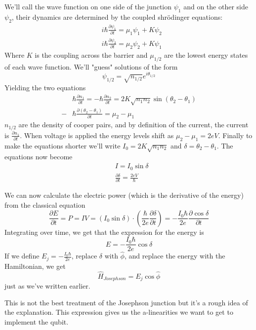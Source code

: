 We'll call the wave function on one side of the junction $\psi_1$ and on the other side $\psi_2$, their dynamics are determined by the coupled shr\"{o}dinger equations:
\begin{align*}
    &i\hbar\frac{\partial \psi_1}{\partial t} = \mu_1 \psi_1 + K \psi_2 \\
    &i\hbar\frac{\partial \psi_2}{\partial t} = \mu_2 \psi_2 + K \psi_1 
\end{align*}
Where $K$ is the coupling across the barrier and $\mu_{1/2}$ are the lowest energy states of each wave function. We'll "guess" solutions of the form
\[
    \psi_{1/2} = \sqrt{n_{1/2}}e^{i\theta_{1/2}}
\]
Yielding the two equations
\begin{align*}
    &\hbar \frac{\partial n_1}{\partial t} = - \hbar \frac{\partial n_2}{\partial t} = 2K \sqrt{n_1 n_2} \sin (\theta_2 - \theta_1) \\
    -&\hbar \frac{\partial (\theta_2 - \theta_1)}{\partial t} = \mu_2 - \mu_1
\end{align*}
$n_{1/2}$ are the density of cooper pairs, and by definition of the current, the current is $\frac{\partial n_1}{\partial t}$. When voltage is applied the energy levels shift as $\mu_2 - \mu_1 = 2eV$. Finally to make the equations shorter we'll write $I_0 = 2K\sqrt{n_1 n_2}$ and $\delta = \theta_2 - \theta_1$. The equations now become
\begin{align*}
    &I = I_0 \sin \delta \\
    &\frac{\partial \delta}{\partial t} = \frac{2eV}{\hbar}
\end{align*}

We can now calculate the electric power (which is the derivative of the energy) from the classical equation
\[
    \frac{\partial E}{\partial t} = P = I V = (I_0 \sin \delta) \cdot (\frac{\hbar}{2e} \frac{\partial \delta}{\partial t}) = -\frac{I_0 \hbar}{2e} \frac{\partial \cos \delta}{\partial t}
\]
Integrating over time, we get that the expression for the energy is
\[
    E = -\frac{I_0 \hbar}{2e} \cos \delta
\]
If we define $E_j = -\frac{I_0 \hbar}{2e}$, replace $\delta$ with $\hat{\phi}$, and replace the energy with the Hamiltonian, we get
\[
    \hat{H}_{Josephson} = E_j \cos \hat{\phi}
\]
just as we've written earlier.

This is not the best treatment of the Josephson junction but it's a rough idea of the explanation. This expression gives us the a-linearities we want to get to implement the qubit.